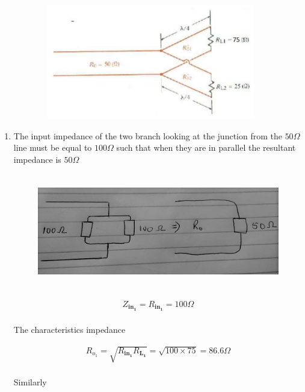\documentclass[12pt,a4paper,openright]{report}
\begin{document}
\begin{enumerate}
		\begin{figure}[H]
			\centering
			\includegraphics[width=11.3cm,height=5cm]{figure2.png}
			\label{F1}
		\end{figure}
	
		\begin{enumerate}
			\item The input impedance of the two branch looking at the junction from the $50\Omega$ line must be equal to $100\Omega$ such that when they are in parallel the resultant impedance is $50\Omega$
			
			\begin{figure}[H]
				\centering
				\includegraphics[width=11.3cm,height=5cm]{fig4.jpeg}
				\label{F1}
			\end{figure}
			
			\begin{align*}
			Z_\mathbf{in_1}=R_\mathbf{in_1}=100\Omega
			\end{align*}
			\\
			The characteristics impedance
			
			\begin{align*}
			R_{o_1}=\sqrt{R_\mathbf{in_1}R_\mathbf{L_1}}=\sqrt{100\times75}=86.6\Omega
			\end{align*}
			\\
			Similarly
			

\end{enumerate}
\end{enumerate}
\end{document}
